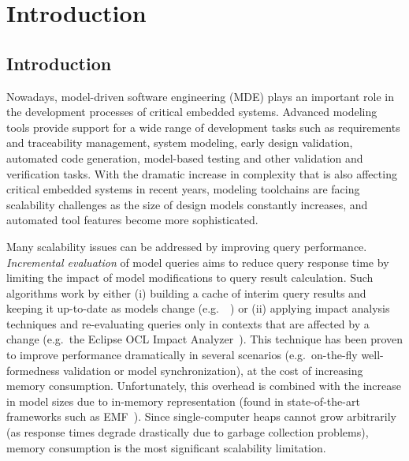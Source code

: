 \chapter{Introduction}

\section{Introduction}
\label{sec:intro}

Nowadays, model-driven software engineering (MDE) plays an important role in the development processes of critical embedded systems. Advanced modeling tools provide support for a wide range of development tasks such as requirements and traceability management, system modeling, early design validation, automated code generation, model-based testing and other validation and verification tasks. 
With the dramatic increase in complexity that is also affecting critical embedded systems in recent years, modeling toolchains are facing scalability challenges as the size of design models constantly increases, and automated tool features become more sophisticated.

Many scalability issues can be addressed by improving query performance. \emph{Incremental evaluation} of model queries aims to reduce query response time by limiting the impact of model modifications to query result calculation. Such algorithms work by either (i) building a cache of interim query results and keeping it up-to-date as models change (e.g.\ \eiq{}~\cite{models10}) or (ii) applying impact analysis techniques and re-evaluating queries only in contexts that are affected by a change (e.g.\ the Eclipse OCL Impact Analyzer~\cite{OCLIA}). This technique has been proven to improve performance dramatically in several scenarios (e.g.\ on-the-fly well-formedness validation or model synchronization), at the cost of increasing memory consumption. Unfortunately, this overhead is combined with the increase in model sizes due to in-memory representation (found in state-of-the-art frameworks such as EMF~\cite{EMF}). Since single-computer heaps cannot grow arbitrarily (as response times degrade drastically due to garbage collection problems), memory consumption is the most significant scalability limitation.%



